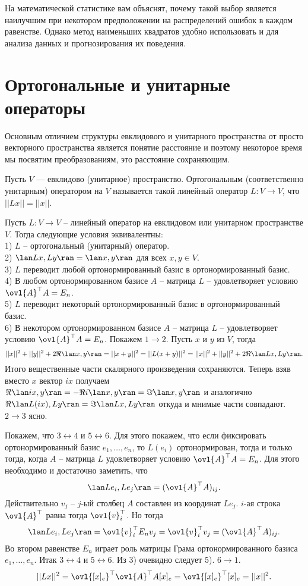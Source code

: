На математической статистике вам объяснят, почему такой выбор является наилучшим при некотором предположении на распределений ошибок в каждом равенстве. Однако метод наименьших квадратов удобно использовать и для анализа данных и прогнозирования их поведения.


\section{Ортогональные и унитарные операторы}

Основным отличием структуры евклидового и унитарного пространства от просто векторного пространства является понятие расстояние и поэтому некоторое время мы посвятим преобразованиям, это расстояние сохраняющим.




\dfn Пусть $V$ --- евклидово (унитарное) пространство. Ортогональным (соответственно унитарным) оператором на $V$ называется такой линейный оператор $L \colon V \to V$, что $||Lx||=||x||$.
\edfn




\thrm Пусть $L \colon V \to V$ -- линейный оператор на евклидовом или унитарном пространстве $V$. Тогда следующие условия эквивалентны:\\
1) $L$ -- ортогональный (унитарный) оператор.\\
2) $\lan Lx,Ly\ran=\lan x,y \ran$ для всех $x,y \in V$.\\
3) $L$ переводит любой ортонормированный базис в ортонормированный базис.\\
4) В любом ортонормированном базисе $A$ -- матрица $L$ -- удовлетворяет условию $\ovl{A}^{\top} A = E_n$.\\
5) $L$ переводит некоторый ортонормированный базис в ортонормированный базис.\\
6) В некотором ортонормированном базисе $A$ --  матрица $L$ -- удовлетворяет условию $\ovl{A}^{\top} A = E_n$.
\proof Покажем $1\to 2$. Пусть $x$ и $y$ из $V$, тогда $$||x||^2+ ||y||^2+ 2\Re\lan x,y\ran= ||x+y||^2= ||L(x+y)||^2= ||x||^2+||y||^2+2\Re \lan Lx,Ly\ran.$$
Итого вещественные части скалярного произведения сохраняются. Теперь взяв вместо $x$ вектор $ix$ получаем $\Re \lan ix,y\ran = - \Re i\lan x,y\ran=\Im \lan x,y\ran$ и аналогично $\Re \lan L(ix),Ly\ran =\Im \lan Lx,Ly \ran$ откуда и мнимые части совпадают.
$2\to 3$ ясно.


Покажем, что $3 \leftrightarrow 4$ и $5 \leftrightarrow 6$. Для этого покажем, что если фиксировать ортонормированный базис $e_1,\dots, e_n$, то $L(e_i)$ ортонормирован, тогда и только тогда, когда $A$ -- матрица $L$ удовлетворяет условию $\ovl{A}^{\top}A=E_n$. Для этого необходимо и достаточно заметить, что $$\lan Le_i, Le_j \ran = (\ovl{A}^{\top}A)_{ij}.$$
Действительно $v_j$ -- $j$-ый столбец $A$ составлен из координат $Le_j$. $i$-ая строка $\ovl{A}^{\top}$ равна тогда $\ovl{v}_i^{\top}$. Но тогда $$\lan Le_i,Le_j\ran = \ovl{v}_i^{\top}E_n v_j= \ovl{v}_i^{\top}v_j= (\ovl{A}^{\top}A)_{ij}.$$
Во втором равенстве $E_n$ играет роль матрицы Грама ортонормированного базиса $e_1,\dots, e_n$.
Итак $3 \leftrightarrow 4$ и $5 \leftrightarrow 6$. Из 3) очевидно следует 5). $6\to 1$. $$||Lx||^2=\ovl{[x]_e}^{\top} \ovl{A}^{\top} A [x]_e= \ovl{[x]_e}^{\top} [x]_e= ||x||^2.$$
\endproof
\ethrm


